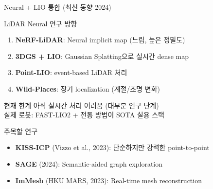 \begin{frame}{Neural + LIO 통합 (최신 동향 2024)}
  \begin{block}{LiDAR Neural 연구 방향}
    \begin{enumerate}
      \item \textbf{NeRF-LiDAR}: Neural implicit map (느림, 높은 정밀도)
      \item \textbf{3DGS + LIO}: Gaussian Splatting으로 실시간 dense map
      \item \textbf{Point-LIO}: event-based LiDAR 처리
      \item \textbf{Wild-Places}: 장기 localization (계절/조명 변화)
    \end{enumerate}
  \end{block}
  \pause
  \begin{alertblock}{현재 한계}
    아직 실시간 처리 어려움 (대부분 연구 단계)\\
    실제 로봇: FAST-LIO2 + 전통 방법이 SOTA 실용 스택
  \end{alertblock}
  \pause
  \begin{exampleblock}{주목할 연구}
    \begin{itemize}
      \item \textbf{KISS-ICP} (Vizzo et al., 2023): 단순하지만 강력한 point-to-point
      \item \textbf{SAGE} (2024): Semantic-aided graph exploration
      \item \textbf{ImMesh} (HKU MARS, 2023): Real-time mesh reconstruction
    \end{itemize}
  \end{exampleblock}
\end{frame}

